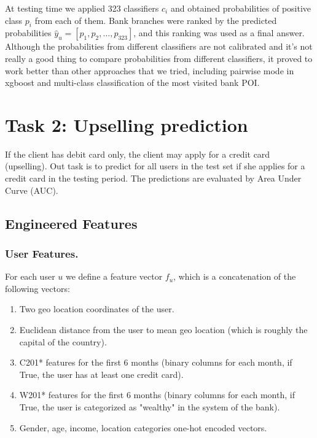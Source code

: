 \documentclass{llncs}
\begin{document}
	At testing time we applied 323 classifiers $c_i$ and obtained probabilities of positive class $p_i$ from each of them. Bank branches were ranked by the predicted probabilities $\hat{y}_u = [p_1, p_2, \ldots, p_{323}]$, and this ranking was used as a final answer. Although the probabilities from different classifiers are not calibrated and it's not really a good thing to compare probabilities from different classifiers, it proved to work better than other approaches that we tried, including pairwise mode in xgboost and multi-class classification of the most visited bank POI.
	
	\section{Task 2: Upselling prediction}
	
	If the client has debit card only, the client may apply for a credit card (upselling).
	Out task is to predict for all users in the test set if she applies for a credit card in the testing period.
	The predictions are evaluated by Area Under Curve (AUC).
	
	\subsection{Engineered Features}
	
	\subsubsection{User Features.}
	
	For each user $u$ we define a feature vector $f_u$, which is a concatenation of the following vectors:
	\begin{enumerate}
		\item Two geo location coordinates of the user.
		\item Euclidean distance from the user to mean geo location (which is roughly the capital of the country).
		\item C201* features for the first 6 months (binary columns for each month, if True, the user has at least one credit card).
		\item W201* features for the first 6 months (binary columns for each month, if True, the user is categorized as "wealthy" in the system of the bank).
		\item Gender, age, income, location categories one-hot encoded vectors.
	\end{enumerate}
	
\end{document}

